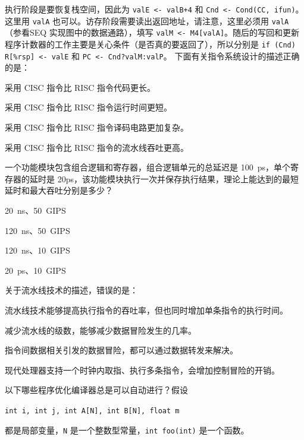 \begin{problems}
        执行阶段是要恢复栈空间，因此为 \verb|valE <- valB+4| 和 \verb|Cnd <- Cond(CC, ifun)|。这里用 \verb|valA| 也可以。访存阶段需要读出返回地址，请注意，这里必须用 \verb|valA|（参看SEQ 实现图中的数据通路），填写 \verb|valM <- M4[valA]|。随后的写回和更新程序计数器的工作主要是关心条件（是否真的要返回了），所以分别是 \verb|if (Cnd) R[%rsp] <- valE| 和 \verb|PC <- Cnd?valM:valP|。
         下面有关指令系统设计的描述正确的是：
        \begin{choices}
            \item 采用 CISC 指令比 RISC 指令代码更长。
            \item 采用 CISC 指令比 RISC 指令运行时间更短。
            \item 采用 CISC 指令比 RISC 指令译码电路更加复杂。
            \item 采用 CISC 指令比 RISC 指令的流水线吞吐更高。
        \end{choices}
         一个功能模块包含组合逻辑和寄存器，组合逻辑单元的总延迟是 \SI{100}{ps}，单个寄存器的延时是 20ps，该功能模块执行一次并保存执行结果，理论上能达到的最短延时和最大吞吐分别是多少？
        \begin{choices}
            \item \SI{20}{ns}、\SI{50}{GIPS}
            \item \SI{120}{ns}、\SI{50}{GIPS}
            \item \SI{120}{ns}、\SI{10}{GIPS}
            \item \SI{20}{ps}、\SI{10}{GIPS}
        \end{choices}
         关于流水线技术的描述，错误的是：
        \begin{choices}
            \item 流水线技术能够提高执行指令的吞吐率，但也同时增加单条指令的执行时间。
            \item 减少流水线的级数，能够减少数据冒险发生的几率。
            \item 指令间数据相关引发的数据冒险，都可以通过数据转发来解决。
            \item 现代处理器支持一个时钟内取指、执行多条指令，会增加控制冒险的开销。
        \end{choices}
         以下哪些程序优化编译器总是可以自动进行？假设
        \begin{center}
            \tt int i, int j, int A[N], int B[N], float m
        \end{center}
        都是局部变量，\verb|N| 是一个整数型常量，\verb|int foo(int)| 是一个函数。

\end{problems}
